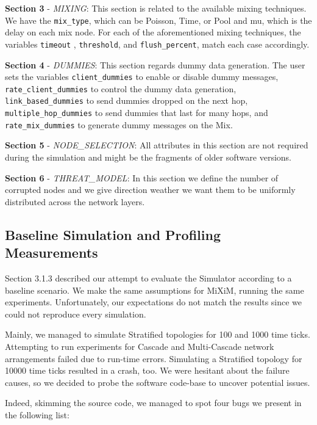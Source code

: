 \documentclass[logo,msc,cyber]{infthesis}   %
\begin{document}
\textbf{Section 3} - \emph{MIXING}: This section is related to the available
mixing techniques. We have the \texttt{mix\_type}, which can be Poisson, Time,
or Pool and mu, which is the delay on each mix node. For each of the
aforementioned mixing techniques, the variables \texttt{timeout} , \texttt{threshold}, and
\texttt{flush\_percent}, match each case accordingly.

\textbf{Section 4} - \emph{DUMMIES}: This section regards dummy data generation.
The user sets the variables \texttt{client\_dummies} to enable or disable dummy
messages, \texttt{rate\_client\_dummies} to control the dummy data generation,
\texttt{link\_based\_dummies} to send dummies dropped on the next hop,
\texttt{multiple\_hop\_dummies} to send dummies that last for many hops, and
\texttt{rate\_mix\_dummies} to generate dummy messages on the Mix.

\textbf{Section 5} - \emph{NODE\_SELECTION}: All attributes in this
section are not required during the simulation and might be the fragments of
older software versions. 

\textbf{Section 6} - \emph{THREAT\_MODEL}: In this section we define the number
of corrupted nodes and we give direction weather we want them to be uniformly
distributed across the network layers.


\subsection{Baseline Simulation and Profiling Measurements}

Section 3.1.3 described our attempt to evaluate the Simulator according to a
baseline scenario. We make the same assumptions for MiXiM, running the same
experiments. Unfortunately, our expectations do not match the results since we
could not reproduce every simulation.

Mainly, we managed to simulate Stratified topologies for 100 and 1000 time
ticks. Attempting to run experiments for Cascade and Multi-Cascade network
arrangements failed due to run-time errors. Simulating a Stratified topology for
10000 time ticks resulted in a crash, too. We were hesitant about the failure
causes, so we decided to probe the software code-base to uncover potential
issues.

Indeed, skimming the source code, we managed to spot four bugs we present in the following list: 
\end{document}

